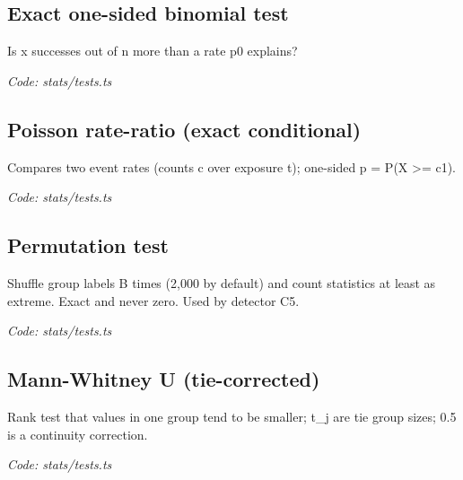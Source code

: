 \documentclass[11pt,a4paper]{article}
\newcommand{\where}[1]{\par{\small\itshape\color{mute}Code: #1}\par}
\begin{document}
\subsection*{Exact one-sided binomial test}
\par\smallskip\noindent{}\par\smallskip
Is x successes out of n more than a rate p0 explains?
\where{stats/tests.ts}

\subsection*{Poisson rate-ratio (exact conditional)}
\par\smallskip\noindent{}\par\smallskip
Compares two event rates (counts c over exposure t); one-sided p = P(X \textgreater{}= c1).
\where{stats/tests.ts}

\subsection*{Permutation test}
\par\smallskip\noindent{}\par\smallskip
Shuffle group labels B times (2,000 by default) and count statistics at least as extreme. Exact and never zero. Used by detector C5.
\where{stats/tests.ts}

\subsection*{Mann-Whitney U (tie-corrected)}
\par\smallskip\noindent{}\par\smallskip
\par\smallskip\noindent{}\par\smallskip
Rank test that values in one group tend to be smaller; t\_j are tie group sizes; 0.5 is a continuity correction.
\where{stats/tests.ts}
\end{document}
